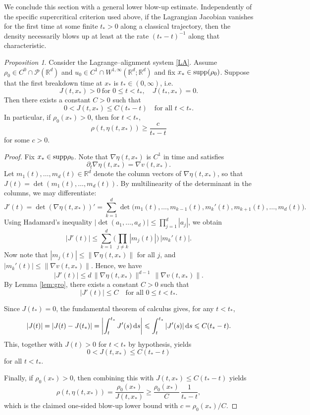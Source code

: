 \documentclass[11pt]{amsart}
\numberwithin{equation}{section}
\newtheorem{proposition}[theorem]{Proposition}
\theoremstyle{definition}
\theoremstyle{remark}
\numberwithin{equation}{section}
\newtheorem{proposition}[theorem]{Proposition}
\newcommand{\R}{\mathbb R}
\newcommand{\lt}{\left}
\newcommand{\rt}{\right}
\newcommand{\calP}{\mathcal P}
\newcommand{\ds}{\textnormal{d}s}
\newcommand{\supp}{{\rm supp}}
\renewcommand{\ge}{\geqslant}
\renewcommand{\le}{\leqslant}
\begin{document}
We conclude this section with a general lower blow-up estimate. Independently of the specific supercritical criterion used above, if the Lagrangian Jacobian vanishes for the first time at some finite $t_*>0$ along a classical trajectory, then the density necessarily blows up at least at the rate $(t_*-t)^{-1}$ along that characteristic.
 \begin{proposition}\label{prop:one_sided_density}  
 Consider the Lagrange--alignment system \eqref{LA}. Assume $\rho_0\in C^0\cap\calP(\R^d)$ and $u_0\in C^1\cap W^{1,\infty}(\R^d;\R^d)$ and fix $x_*\in\supp(\rho_0)$. Suppose that the first breakdown time at $x_*$ is $t_*\in(0,\infty)$, i.e.
\[
J(t,x_*)>0\ \text{for }0\le t<t_*, \quad J(t_*,x_*)=0.
\]
Then there exists a constant $C>0$ such that
\[
0<J(t,x_*)\le C(t_*-t)\quad\text{for all $t < t_*$.}
\]
In particular, if $\rho_0(x_*)>0$, then for $t<t_*$,
\[
\rho(t,\eta(t,x_*)) \ge \frac{c}{t_*-t}
\]
for some $c>0$.
\end{proposition}
\begin{proof}
Fix $x_*\in\supp\rho_0$. Note that $\nabla\eta(t,x_*)$ is $C^1$ in time and satisfies
\[
\partial_t \nabla\eta(t,x_*)=\nabla v(t,x_*).
\]
Let $m_1(t),\dots,m_d(t)\in\R^d$ denote the column vectors of $\nabla\eta(t,x_*)$, so that
$J(t)=\det(m_1(t),\dots,m_d(t))$.
By multilinearity of the determinant in the columns, we may differentiate:
\[
J'(t) = \det(\nabla\eta(t,x_*))' = \sum_{k=1}^d \det\big(m_1(t),\dots,m_{k-1}(t),m_k'(t),m_{k+1}(t),\dots,m_d(t)\big).
\]
Using Hadamard's inequality $|\det(a_1,\dots,a_d)|\le \prod_{j=1}^d |a_j|$,
we obtain
\[
|J'(t)|
\le \sum_{k=1}^d \bigg(\prod_{j\neq k}|m_j(t)|\bigg)\,|m_k'(t)|.
\]
Now note that $|m_j(t)|\le \|\nabla\eta(t,x_*)\|$ for all $j$, and $|m_k'(t)|\le \|\nabla v(t,x_*)\|$.
Hence, we have
\[
|J'(t)| \le  d\,\|\nabla\eta(t,x_*)\|^{d-1}\,\|\nabla v(t,x_*)\|.
\]
By Lemma \ref{lem:gro}, there exists a constant $C>0$ such that
\[
|J'(t)|\le C \quad\text{for all }0\le t<t_*.
\]

Since $J(t_*)=0$, the fundamental theorem of calculus gives, for any $t<t_*$,
\[
|J(t)|=|J(t)-J(t_*)| = \lt|\int_t^{t_*} J'(s)\,\ds\rt| \le \int_t^{t_*} |J'(s)|\,\ds \le C(t_*-t).
\]
This, together with $J(t)>0$ for $t<t_*$ by hypothesis, yields
\[
0<J(t,x_*)\le C(t_*-t)
\]
for all $t<t_*$.

Finally, if $\rho_0(x_*)>0$, then combining this with $J(t,x_*)\le C(t_*-t)$ yields
\[
\rho(t,\eta(t,x_*)) =\frac{\rho_0(x_*)}{J(t,x_*)} \ge \frac{\rho_0(x_*)}{C}\,\frac1{t_*-t},
\]
which is the claimed one-sided blow-up lower bound with $c=\rho_0(x_*)/C$.
\end{proof}

 

  

%
%
%
%
 




 
\end{document}
